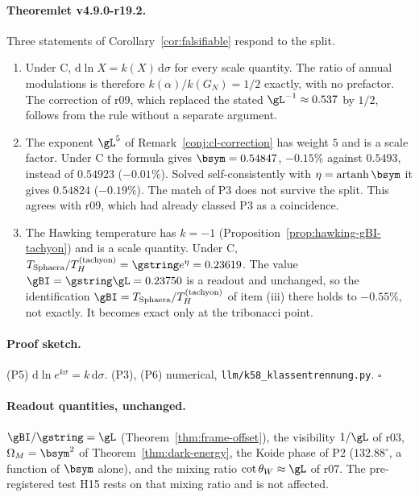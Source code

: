 \paragraph{Theoremlet v4.9.0-r19.2.}
Three statements of Corollary~\ref{cor:falsifiable} respond to the split.
\begin{enumerate}[leftmargin=2em]
\item[(P5)] Under C, \(\mathrm d\ln X=k(X)\,\mathrm d\sigma\) for every scale quantity.  The ratio of annual modulations is therefore
\(k(\alpha)/k(G_N)=1/2\) exactly, with no prefactor.  The correction of r09, which replaced the stated \(\gL^{-1}\approx0.537\) by
\(1/2\), follows from the rule without a separate argument.
\item[(P3)] The exponent \(\gL^5\) of Remark~\ref{conj:cl-correction} has weight \(5\) and is a scale factor.  Under C the formula gives
\(\bsym=0.54847\), \(-0.15\%\) against \(0.5493\), instead of \(0.54923\) (\(-0.01\%\)).  Solved self-consistently with
\(\eta=\operatorname{artanh}\bsym\) it gives \(0.54824\) (\(-0.19\%\)).  The match of P3 does not survive the split.  This agrees with r09,
which had already classed P3 as a coincidence.
\item[(P6)] The Hawking temperature has \(k=-1\) (Proposition~\ref{prop:hawking-gBI-tachyon}) and is a scale quantity.  Under C,
\(T_{\rm Sphaera}/T_H^{(\mathrm{tachyon})}=\gstring e^\eta=0.23619\).  The value \(\gBI=\gstring\gL=0.23750\) is a readout and
unchanged, so the identification \(\gBI=T_{\rm Sphaera}/T_H^{(\mathrm{tachyon})}\) of item (iii) there holds to \(-0.55\%\), not
exactly.  It becomes exact only at the tribonacci point.
\end{enumerate}

\paragraph{Proof sketch.}
(P5) \(\mathrm d\ln e^{k\sigma}=k\,\mathrm d\sigma\).  (P3), (P6) numerical, \texttt{llm/k58\_klassentrennung.py}.  \(\square\)

\paragraph{Readout quantities, unchanged.}
\(\gBI/\gstring=\gL\) (Theorem~\ref{thm:frame-offset}), the visibility \(1/\gL\) of r03, \(\Omega_M=\bsym^2\) of
Theorem~\ref{thm:dark-energy}, the Koide phase of P2 (\(132.88^\circ\), a function of \(\bsym\) alone), and the mixing ratio
\(\cot\theta_W\approx\gL\) of r07.  The pre-registered test H15 rests on that mixing ratio and is not affected.

